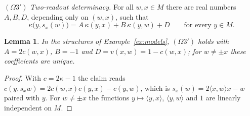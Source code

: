\documentclass[11pt,reqno]{amsart}
\newtheorem{lemma}[theorem]{Lemma}
\theoremstyle{definition}
\theoremstyle{remark}
\numberwithin{equation}{section}
\newcommand{\ip}[2]{\langle #1,#2\rangle}
\begin{document}
\smallskip\noindent$(\Omega3')$ \emph{Two-readout determinacy.}  For all $w,x\in M$ there are real numbers
$A,B,D$, depending only on $(w,x)$, such that
\[
\kappa\bigl(y,s_x(w)\bigr)=A\,\kappa(y,x)+B\,\kappa(y,w)+D\qquad\text{for every }y\in M .
\]

\begin{lemma}\label{lem:opmodel}
In the structures of Example~\ref{ex:models}, $(\Omega3')$ holds with $A=2c(w,x)$, $B=-1$ and $D=v(x,w)=1-c(w,x)$;
for $w\ne\pm x$ these coefficients are unique.
\end{lemma}
\begin{proof}
With $c=2\kappa-1$ the claim reads $c(y,s_xw)=2c(w,x)c(y,x)-c(y,w)$, which is $s_x(w)=2\ip xwx-w$ paired with $y$.
For $w\ne\pm x$ the functions $y\mapsto\ip yx$, $\ip yw$ and $1$ are linearly independent on $M$.
\end{proof}
\end{document}
